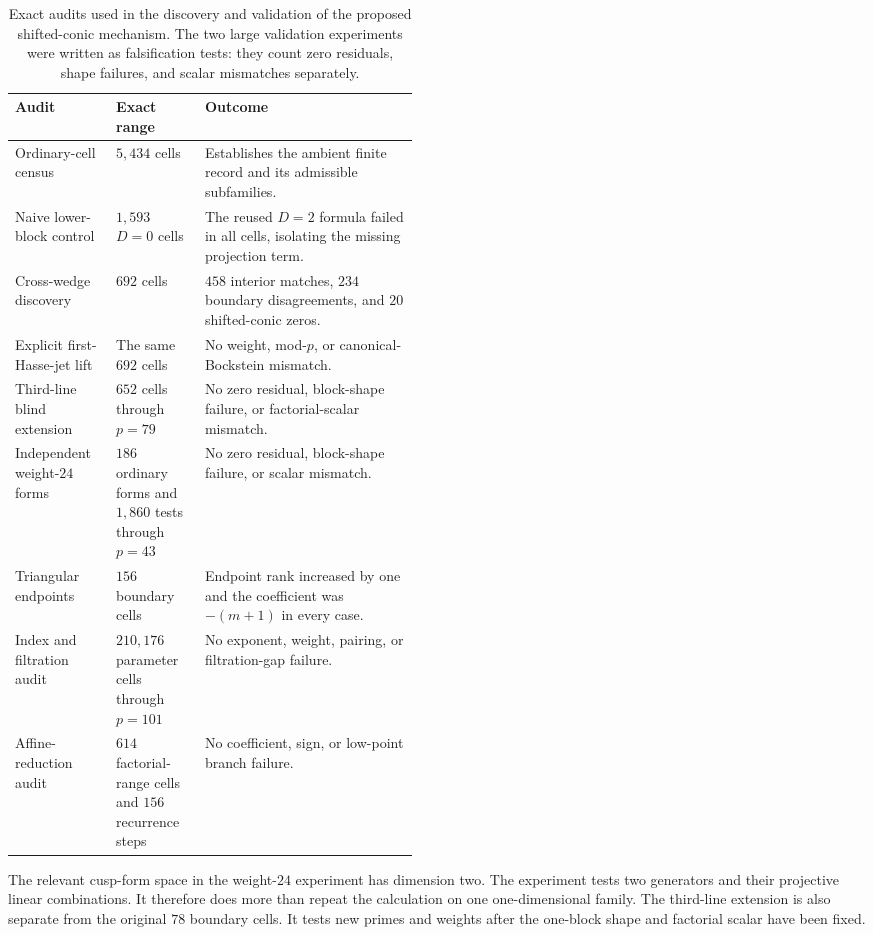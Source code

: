 \begin{table}[t]
\centering
\small
\renewcommand{\arraystretch}{1.13}
\begin{tabularx}{\linewidth}{@{}>{\raggedright\arraybackslash}p{0.25\linewidth}>{\raggedright\arraybackslash}p{0.22\linewidth}>{\raggedright\arraybackslash}X@{}}
\toprule
Audit & Exact range & Outcome\\
\midrule
Ordinary-cell census & $5{,}434$ cells & Establishes the ambient finite
record and its admissible subfamilies.\\
Naive lower-block control & $1{,}593$ $D=0$ cells & The reused $D=2$
formula failed in all cells, isolating the missing projection term.\\
Cross-wedge discovery & $692$ cells & $458$ interior matches, $234$
boundary disagreements, and $20$ shifted-conic zeros.\\
Explicit first-Hasse-jet lift & The same $692$ cells & No weight,
mod-$p$, or canonical-Bockstein mismatch.\\
Third-line blind extension & $652$ cells through $p=79$ & No zero
residual, block-shape failure, or factorial-scalar mismatch.\\
Independent weight-$24$ forms & $186$ ordinary forms and $1{,}860$ tests
through $p=43$ & No zero residual, block-shape failure, or scalar mismatch.\\
Triangular endpoints & $156$ boundary cells & Endpoint rank increased by
one and the coefficient was $-(m+1)$ in every case.\\
Index and filtration audit & $210{,}176$ parameter cells through $p=101$ &
No exponent, weight, pairing, or filtration-gap failure.\\
Affine-reduction audit & $614$ factorial-range cells and $156$ recurrence
steps & No coefficient, sign, or low-point branch failure.\\
\bottomrule
\end{tabularx}
\caption{Exact audits used in the discovery and validation of the proposed
shifted-conic mechanism.  The two large validation experiments were written
as falsification tests: they count zero residuals, shape failures, and scalar
mismatches separately.}
\label{tab:experimental-audit}
\end{table}

The relevant cusp-form space in the weight-$24$ experiment has dimension
two.  The experiment tests two generators and their projective linear
combinations.  It therefore does more than repeat the calculation on one
one-dimensional family.  The third-line extension is also separate from the
original $78$ boundary cells.  It tests new primes and weights after the
one-block shape and factorial scalar have been fixed.

